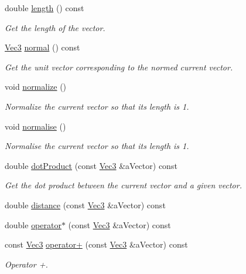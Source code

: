 \begin{DoxyCompactItemize}
double \hyperlink{class_math_1_1_vec3_ac08670872d34c04db0643b20051aa2a6}{length} () const 
\begin{DoxyCompactList}\small\item\em Get the length of the vector. \end{DoxyCompactList}\item 
\hyperlink{class_math_1_1_vec3}{Vec3} \hyperlink{class_math_1_1_vec3_a7c297a2db8e2d2c8d96626e1f037c506}{normal} () const 
\begin{DoxyCompactList}\small\item\em Get the unit vector corresponding to the normed current vector. \end{DoxyCompactList}\item 
void \hyperlink{class_math_1_1_vec3_aac516bf8cf2b0abe1d96c32ae83644d0}{normalize} ()
\begin{DoxyCompactList}\small\item\em Normalize the current vector so that its length is 1. \end{DoxyCompactList}\item 
void \hyperlink{class_math_1_1_vec3_a6abaf3935a4507648c492d1fe90d4dc7}{normalise} ()
\begin{DoxyCompactList}\small\item\em Normalise the current vector so that its length is 1. \end{DoxyCompactList}\item 
double \hyperlink{class_math_1_1_vec3_ae4fa4fabd84a4711c9494872a6593495}{dotProduct} (const \hyperlink{class_math_1_1_vec3}{Vec3} \&aVector) const 
\begin{DoxyCompactList}\small\item\em Get the dot product between the current vector and a given vector. \end{DoxyCompactList}\item 
double \hyperlink{class_math_1_1_vec3_a5aab62e1729b0e27b544cfd5c89cc0f4}{distance} (const \hyperlink{class_math_1_1_vec3}{Vec3} \&aVector) const 
\item 
double \hyperlink{class_math_1_1_vec3_af4e46f39f829553745000a725f6b946a}{operator$\ast$} (const \hyperlink{class_math_1_1_vec3}{Vec3} \&aVector) const 
\item 
const \hyperlink{class_math_1_1_vec3}{Vec3} \hyperlink{class_math_1_1_vec3_a99eea813a1772346fbd86699eee96508}{operator+} (const \hyperlink{class_math_1_1_vec3}{Vec3} \&aVector) const 
\begin{DoxyCompactList}\small\item\em Operator +. \end{DoxyCompactList}\item 

\end{DoxyCompactItemize}
